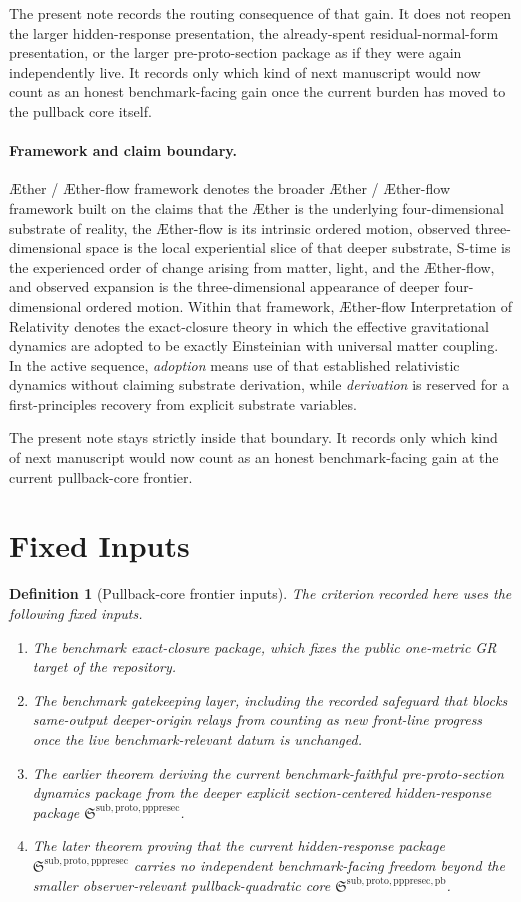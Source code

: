 \documentclass[11pt]{article}
\newcommand{\Aether}{\AE{}ther}
\newcommand{\Aflow}{\AE{}ther-flow}
\newcommand{\TheoryName}{\Aflow{} Interpretation of Relativity}
\newcommand{\TheoryProgram}{\Aether{} / \Aflow{} framework}
\newcommand{\PrePreProtoSectionPackage}{\mathfrak S^{\mathrm{sub,proto,pppresec}}}
\newcommand{\PrePreProtoSectionPullbackCore}{\mathfrak S^{\mathrm{sub,proto,pppresec,pb}}}
\newtheorem{definition}{Definition}
\begin{document}
The present note records the routing consequence of that gain. It does not reopen the larger hidden-response presentation, the already-spent residual-normal-form presentation, or the larger pre-proto-section package as if they were again independently live. It records only which kind of next manuscript would now count as an honest benchmark-facing gain once the current burden has moved to the pullback core itself.

\paragraph{Framework and claim boundary.}
\TheoryProgram{} denotes the broader \Aether{} / \Aflow{} framework built on the claims that the \Aether{} is the underlying four-dimensional substrate of reality, the \Aflow{} is its intrinsic ordered motion, observed three-dimensional space is the local experiential slice of that deeper substrate, S-time is the experienced order of change arising from matter, light, and the \Aflow{}, and observed expansion is the three-dimensional appearance of deeper four-dimensional ordered motion. Within that framework, \TheoryName{} denotes the exact-closure theory in which the effective gravitational dynamics are adopted to be exactly Einsteinian with universal matter coupling. In the active sequence, \emph{adoption} means use of that established relativistic dynamics without claiming substrate derivation, while \emph{derivation} is reserved for a first-principles recovery from explicit substrate variables.

The present note stays strictly inside that boundary. It records only which kind of next manuscript would now count as an honest benchmark-facing gain at the current pullback-core frontier.

\section{Fixed Inputs}

\begin{definition}[Pullback-core frontier inputs]
The criterion recorded here uses the following fixed inputs.
\begin{enumerate}
    \item The benchmark exact-closure package, which fixes the public one-metric GR target of the repository.
    \item The benchmark gatekeeping layer, including the recorded safeguard that blocks same-output deeper-origin relays from counting as new front-line progress once the live benchmark-relevant datum is unchanged.
    \item The earlier theorem deriving the current benchmark-faithful pre-proto-section dynamics package from the deeper explicit section-centered hidden-response package \(\PrePreProtoSectionPackage\).
    \item The later theorem proving that the current hidden-response package \(\PrePreProtoSectionPackage\) carries no independent benchmark-facing freedom beyond the smaller observer-relevant pullback-quadratic core \(\PrePreProtoSectionPullbackCore\).
\end{enumerate}
\end{definition}
\end{document}
